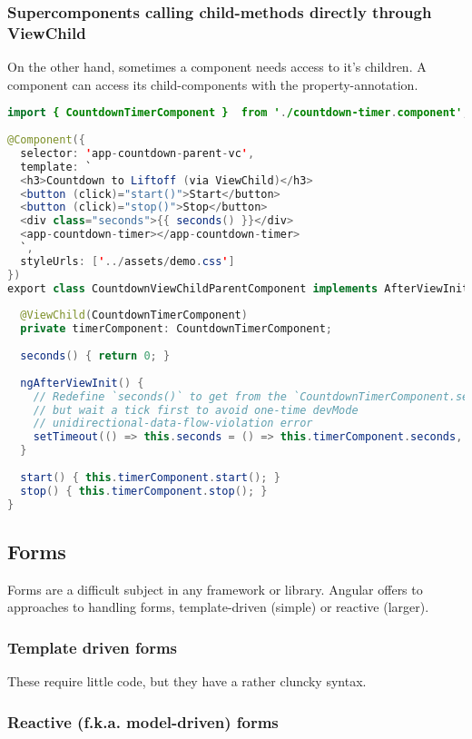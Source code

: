 \subsubsection{Supercomponents calling child-methods directly through ViewChild}
On the other hand, sometimes a component needs access to it's children. A component can access its child-components with the  property-annotation.
\begin{lstlisting}[language=java]
import { CountdownTimerComponent }  from './countdown-timer.component';
 
@Component({
  selector: 'app-countdown-parent-vc',
  template: `
  <h3>Countdown to Liftoff (via ViewChild)</h3>
  <button (click)="start()">Start</button>
  <button (click)="stop()">Stop</button>
  <div class="seconds">{{ seconds() }}</div>
  <app-countdown-timer></app-countdown-timer>
  `,
  styleUrls: ['../assets/demo.css']
})
export class CountdownViewChildParentComponent implements AfterViewInit {
 
  @ViewChild(CountdownTimerComponent)
  private timerComponent: CountdownTimerComponent;
 
  seconds() { return 0; }
 
  ngAfterViewInit() {
    // Redefine `seconds()` to get from the `CountdownTimerComponent.seconds` ...
    // but wait a tick first to avoid one-time devMode
    // unidirectional-data-flow-violation error
    setTimeout(() => this.seconds = () => this.timerComponent.seconds, 0);
  }
 
  start() { this.timerComponent.start(); }
  stop() { this.timerComponent.stop(); }
}
\end{lstlisting}

\subsection{Forms}
Forms are a difficult subject in any framework or library. Angular offers to approaches to handling forms, template-driven (simple) or reactive (larger).

\subsubsection{Template driven forms}
These require little code, but they have a rather cluncky syntax.

\subsubsection{Reactive (f.k.a. model-driven) forms}

